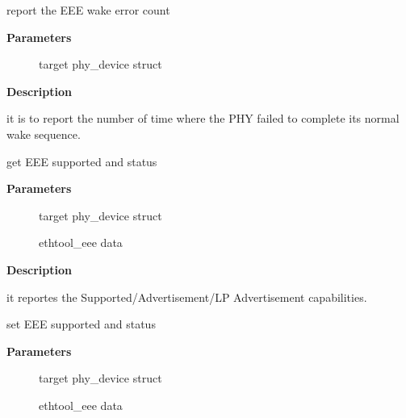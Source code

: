 \documentclass[a4paper,8pt,english]{sphinxmanual}
\begin{document}
\begin{fulllineitems}
\label{networking/kapi:c.phy_get_eee_err}
report the EEE wake error count

\end{fulllineitems}


\textbf{Parameters}
\begin{description}
\item[{}] \leavevmode
target phy\_device struct

\end{description}

\textbf{Description}

it is to report the number of time where the PHY
failed to complete its normal wake sequence.

\begin{fulllineitems}
\label{networking/kapi:c.phy_ethtool_get_eee}
get EEE supported and status

\end{fulllineitems}


\textbf{Parameters}
\begin{description}
\item[{}] \leavevmode
target phy\_device struct

\item[{}] \leavevmode
ethtool\_eee data

\end{description}

\textbf{Description}

it reportes the Supported/Advertisement/LP Advertisement
capabilities.

\begin{fulllineitems}
\label{networking/kapi:c.phy_ethtool_set_eee}
set EEE supported and status

\end{fulllineitems}


\textbf{Parameters}
\begin{description}
\item[{}] \leavevmode
target phy\_device struct

\item[{}] \leavevmode
ethtool\_eee data

\end{description}
\end{document}
